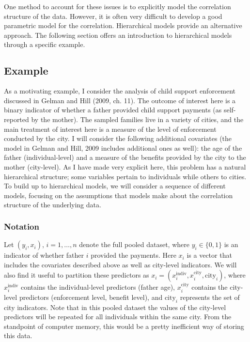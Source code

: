 \documentclass[12pt]{article}
\begin{document}
One method to account for these issues is to explicitly model the 
correlation structure of the data. However, it is often very difficult to develop a good parametric model for the correlation. Hierarchical models provide an alternative approach. The following section
offers an introduction to hierarchical models through a specific example. 

\subsection{Example}
As a motivating example, I consider the analysis of child support enforcement discussed in Gelman and Hill (2009, ch. 11). The outcome of interest here is a binary indicator of whether a father provided child
support payments (as self-reported by the mother). The sampled families live in a variety of cities, and the main treatment of interest here is a measure of the level of enforcement conducted by the city. I will 
consider the following additional covariates (the model in Gelman and Hill, 2009 includes additional ones as well): the age of the father (individual-level) and a measure of the benefits provided by the city to 
the mother (city-level). As I have made very explicit here, this problem has a natural hierarchical structure; some variables pertain to individuals while others to cities. To build up to hierarchical models, we will
consider a sequence of different models, focusing on the assumptions that models make about the correlation structure of the underlying data.

\subsubsection{Notation}
Let $(y_i, x_i)$, $i = 1, \dots, n$ denote the full pooled dataset, where $y_i \in \{0, 1\}$ is an indicator of whether father $i$ provided the payments. Here $x_i$ is a vector that includes the covariates described above as well as city-level indicators. We will also find it useful to partition these predictors as $x_i = (x_i^{\text{indiv}}, x_i^{\text{city}}, \text{city}_i)$, where $x_i^{\text{indiv}}$ contains the individual-level predictors (father age), $x_i^{\text{city}}$ contains the city-level predictors (enforcement level, benefit level), and $\text{city}_i$ represents the set of city indicators. Note that in this pooled dataset the values
of the city-level predictors will be repeated for all individuals within the same city. From the standpoint of computer memory, this would be a pretty inefficient way of storing this data. 
\end{document}
